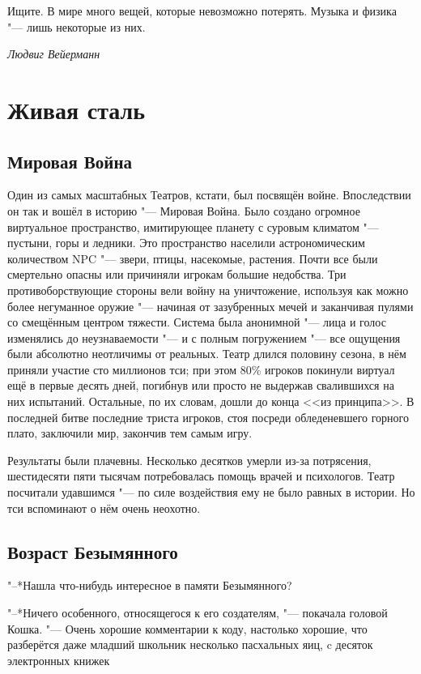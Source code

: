 \documentclass[a4paper,10pt]{book}
\newcommand{\ldotst}{\so{...}\xspace}
\begin{document}
\epigraph{Ищите. В мире много вещей, которые невозможно потерять. Музыка и 
физика "---
лишь некоторые из них.}
{\textit{Людвиг Вейерманн}}
 
\chapter{Живая сталь}
 
 \section{Мировая Война}

 Один из самых масштабных Театров, кстати, был посвящён войне. Впоследствии он так и вошёл в историю "--- Мировая Война. Было создано огромное виртуальное пространство, имитирующее планету с суровым климатом "--- пустыни, горы и ледники. Это пространство населили астрономическим количеством NPC "--- звери, птицы, насекомые, растения. Почти все были смертельно опасны или причиняли игрокам большие недобства. Три противоборствующие стороны вели войну на уничтожение, используя как можно более негуманное оружие "--- начиная от зазубренных мечей и заканчивая пулями со смещённым центром тяжести. Система была анонимной "--- лица и голос изменялись до неузнаваемости "--- и с полным погружением "--- все ощущения были абсолютно неотличимы от реальных. Театр длился половину сезона, в нём приняли участие сто миллионов тси; при этом 80\% игроков покинули виртуал ещё в первые десять дней, погибнув или просто не выдержав свалившихся на них испытаний. Остальные, по их словам, дошли до конца <<из принципа>>. В последней битве последние триста игроков, стоя посреди обледеневшего горного плато, заключили мир, закончив тем самым игру.

Результаты были плачевны. Несколько десятков умерли из-за потрясения, шестидесяти пяти тысячам потребовалась помощь врачей и психологов. Театр посчитали удавшимся "--- по силе воздействия ему не было равных в истории. Но тси вспоминают о нём очень неохотно.

 \section{Возраст Безымянного}

 "--*Нашла что-нибудь интересное в памяти Безымянного?

"--*Ничего особенного, относящегося к его создателям, "--- покачала головой Кошка. "--- Очень хорошие комментарии к коду, настолько хорошие, что разберётся даже младший школьник\ldotst несколько пасхальных яиц, c десяток электронных книжек\ldotst
\end{document}
